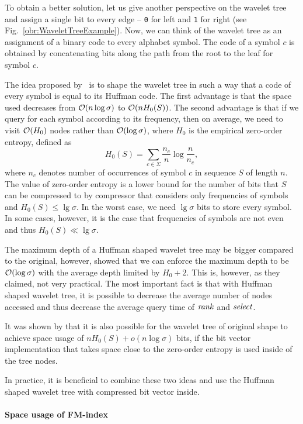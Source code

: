 To obtain a better solution, let us give another perspective on the wavelet tree and assign
a single bit to every edge -- {\tt 0} for left and {\tt 1} for right (see Fig.~\ref{obr:WaveletTreeExample}).
Now, we can think of the wavelet tree as an assignment of a binary code to every alphabet symbol.
The code of a symbol $c$ is obtained by concatenating bits along the path from the root to the leaf
for symbol $c$.

The idea proposed by~\cite{makinen2005succinct} is to shape the wavelet tree in such a way that
a code of every symbol is equal to its Huffman code. The first advantage is that the space used
decreases from $\mathcal{O}(n\log \sigma)$ to $\mathcal{O}(nH_0(S))$. The second advantage is that if
we query for each symbol according to its frequency, then on average, we need to visit
$\mathcal{O}(H_0)$ nodes rather than $\mathcal{O}(\log \sigma)$, where $H_0$ is the empirical zero-order
entropy, defined as $$H_0(S)=\sum_{c\in\Sigma} \frac{n_c}{n} \log \frac{n}{n_c},$$
where $n_c$ denotes number of occurrences of symbol $c$ in sequence $S$ of length $n$. The value
of zero-order entropy is a lower bound for the number of bits that $S$ can be compressed to by
compressor that considers only frequencies of symbols and $H_0(S)\leq \lg\sigma$. In the worst
case, we need $\lg \sigma$ bits to store every symbol. In some cases, however, it is the case
that frequencies of symbols are not even and thus $H_0(S)\ll \lg\sigma$.

The maximum depth of a Huffman shaped wavelet tree may be bigger compared to the original, however,
\cite{grabowski2004first} showed that we can enforce the maximum depth to be $\mathcal{O}(\log \sigma)$
with the average depth limited by $H_0+2$. This is, however, as they claimed, not very practical.
The most important fact is that with Huffman shaped wavelet tree, it is possible to decrease the
average number of nodes accessed and thus decrease the average query time of $\mathit{rank}$ and $\mathit{select}$.

It was shown by \cite{grossi2003high} that it is also possible for the wavelet tree of original shape
to achieve space usage of $nH_0(S) + o(n\log\sigma)$ bits, if the bit vector implementation that takes
space close to the zero-order entropy is used inside of the tree nodes.

In practice, it is beneficial to combine these two ideas and use the Huffman shaped wavelet tree with
compressed bit vector inside.

\paragraph{Space usage of FM-index}

